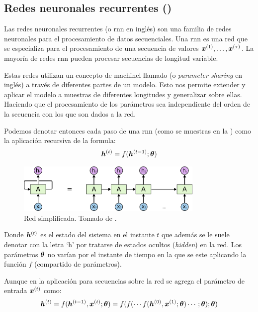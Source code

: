 \subsection{Redes neuronales recurrentes ()}
Las redes neuronales recurrentes (o \gls{rnn} en inglés) son una familia de redes neuronales para el procesamiento de datos secuenciales. Una \gls{rnn} es una red que se especializa para el procesamiento de una secuencia de valores ${\bm{x}}^{(1)}, \ldots, {\bm{x}}^{(\tau)}$. La mayoría de redes \gls{rnn} pueden procesar secuencias de longitud variable.

Estas redes utilizan un concepto de \gls{machinel} llamado  (o \textsl{parameter sharing} en inglés) a través de diferentes partes de un modelo. Esto nos permite extender y aplicar el modelo a muestras de diferentes longitudes y generalizar sobre ellas. Haciendo que el procesamiento de los parámetros sea independiente del orden de la secuencia con los que son dados a la red.

Podemos denotar entonces cada paso de una \gls{rnn} (como se muestras en la ) como la aplicación recursiva de la formula:
\begin{equation}
  {\bm{h}}^{(t)} = f({\bm{h}}^{(t-1)}; {\bm{\theta}})
\end{equation}

\begin{figure}[H]
  \centering
  \includegraphics[width=0.8\textwidth]{Figures/RNN-unrolled.png}
\decoRule
\caption[Red  simplificada]{Red  simplificada. Tomado de \cite{understanding-lstm}.}
\label{fig:rnn-classic-simple}
\end{figure}

Donde ${\bm{h}}^{(t)}$ es el estado del sistema en el instante $t$ que además se le suele denotar con la letra `h' por tratarse de estados ocultos (\textsl{hidden}) en la red. Los parámetros ${\bm{\theta}}$ no varían por el instante de tiempo en la que se este aplicando la función $f$ (compartido de parámetros).

Aunque en la aplicación para secuencias sobre la red se agrega el parámetro de entrada ${\bm{x}}^{(t)}$ como:
\begin{equation}
  {\bm{h}}^{(t)} = f({\bm{h}}^{(t-1)}, {\bm{x}}^{(t)} ; {\bm{\theta}}) = f(f(\cdots f({\bm{h}}^{(0)}, {\bm{x}}^{(1)}; {\bm{\theta}}) \cdots ; {\bm{\theta}}); {\bm{\theta}})
\end{equation}

